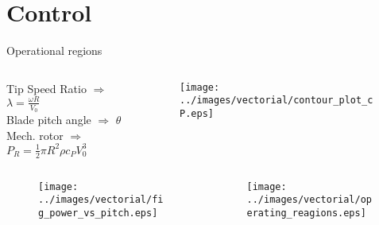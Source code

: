 \section{Control}
\begin{frame}{Operational regions}

  \begin{columns}

    \begin{column}{0.5\columnwidth}
      Tip Speed Ratio $\Rightarrow$ $\lambda=\frac{\omega R}{V_0}$\\
      Blade pitch angle $\Rightarrow$ $\theta$\\
      Mech. rotor $\Rightarrow$ $P_R = \frac{1}{2}\pi R^2 \rho c_{P} V_0^3$
    \end{column}

    \begin{column}{0.5\columnwidth}
      \begin{figure}
        \centering
        \texttt{[image: ../images/vectorial/contour\_plot\_cP.eps]}
      \end{figure}
    \end{column}
    
  \end{columns}

\begin{columns}
  \begin{column}{0.5\columnwidth}
    \begin{figure}
      \centering
      \texttt{[image: ../images/vectorial/fig\_power\_vs\_pitch.eps]}
    \end{figure}
  \end{column}
  \begin{column}{0.5\columnwidth}
    \begin{figure}[H]
      \centering
      \texttt{[image: ../images/vectorial/operating\_reagions.eps]}
    \end{figure}
  \end{column}
\end{columns}
\end{frame}

